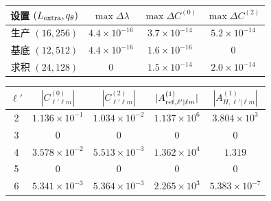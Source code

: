 \documentclass[UTF8,fontset=fandol,12pt,a4paper,oneside,openany]{ctexrep}
\begin{document}
\par\addvspace{14pt}
\noindent\begin{minipage}{\linewidth}
\captionsetup{type=table}\caption{角向球谐截断与 Gauss 求积的独立检验。}\label{audit:tab:angular-convergence}
\centering\fontsize{10.5}{14}\selectfont
\setlength{\tabcolsep}{6pt}\renewcommand{\arraystretch}{1.2}
\begin{tabular}{cccc}\toprule
设置 $(L_{\rm extra},q_\theta)$ & $\max\Delta\lambda$ & $\max\Delta C^{(0)}$ & $\max\Delta C^{(2)}$\\\midrule
生产 $(16,256)$ & $4.4\times10^{-16}$ & $3.7\times10^{-14}$ & $5.2\times10^{-14}$\\
基底 $(12,512)$ & $4.4\times10^{-16}$ & $1.6\times10^{-16}$ & $0$\\
求积 $(24,128)$ & $0$ & $1.5\times10^{-14}$ & $2.0\times10^{-14}$\\
\bottomrule\end{tabular}
\end{minipage}\par\addvspace{10pt}
\par\addvspace{14pt}
\noindent\begin{minipage}{\linewidth}
\captionsetup{type=table}\caption{非线性目标角通道及选择定则结果。}\label{audit:tab:channels}
\centering\fontsize{10.5}{14}\selectfont
\setlength{\tabcolsep}{6pt}\renewcommand{\arraystretch}{1.2}
\begin{tabular}{ccccc}\toprule
$\ell'$ & $|C^{(0)}_{\ell'\ell m}|$ & $|C^{(2)}_{\ell'\ell m}|$ & $|A_{{\rm ref},\ell'|\ell m}^{(1)}|$ & $|A_{H,\ell'|\ell m}^{(1)}|$\\\midrule
2 & $1.136\times10^{-1}$ & $1.034\times10^{-2}$ & $1.137\times10^{6}$ & $3.804\times10^{3}$\\
3 & $0$ & $0$ & $0$ & $0$\\
4 & $3.578\times10^{-2}$ & $5.513\times10^{-3}$ & $1.362\times10^{4}$ & $1.319$\\
5 & $0$ & $0$ & $0$ & $0$\\
6 & $5.341\times10^{-3}$ & $5.364\times10^{-3}$ & $2.265\times10^{3}$ & $5.383\times10^{-7}$\\
\bottomrule\end{tabular}
\end{minipage}\par\addvspace{10pt}
\par\addvspace{14pt}
\end{document}
